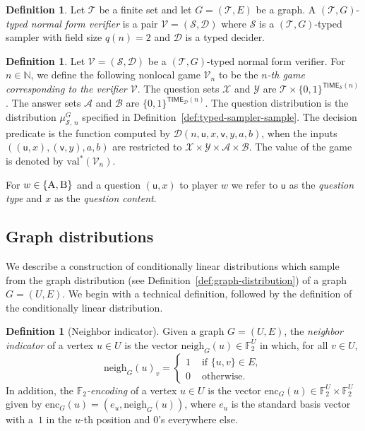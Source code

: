 \documentclass[11pt]{article}
\theoremstyle{definition}
\newtheorem{definition}[theorem]{Definition}
\newcommand{\N}{\ensuremath{\mathbb{N}}}
\newcommand{\F}{\ensuremath{\mathbb{F}}}
\newcommand{\val}{\ensuremath{\mathrm{val}}}
\newcommand{\sampler}{\mathcal{S}}
\newcommand{\decider}{\mathcal{D}}
\newcommand{\verifier}{\mathcal{V}}
\newcommand{\type}{\mathcal{T}}
\newcommand{\labelstyle}[1]{\ensuremath{\textsc{#1}}\xspace}
\newcommand{\tvarstyle}[1]{\mathsf{#1}}
\newcommand{\lvar}{\ensuremath{\tvarstyle{u}}}
\newcommand{\rvar}{\ensuremath{\tvarstyle{v}}}
\newcommand{\alice}{\labelstyle{A}}
\newcommand{\bob}{\labelstyle{B}}
\renewcommand{\cal}[1]{\mathcal{#1}}
\newcommand{\TIME}{\mathsf{TIME}}
\begin{document}
\begin{definition}
  \label{def:typed-normal-ver}
  Let $\type$ be a finite set and let $G = (\type, E)$ be a graph.
  A $(\type, G)$-\emph{typed normal form verifier} is a pair $\verifier =
  (\sampler, \decider)$ where $\sampler$ is a $(\type,G)$-typed sampler with field
  size $q(n) = 2$ and $\decider$ is a typed decider.
\end{definition}

\begin{definition}
  \label{def:typed-normal-game}
  Let $\verifier = (\sampler, \decider)$ be a $(\type, G)$-typed normal form
  verifier.
  For $n \in \N$, we define the following nonlocal game $\verifier_{n}$ to be
  the \emph{$n$-th game corresponding to the verifier $\verifier$}.
  The question sets $\cal{X}$ and $\cal{Y}$ are $\type \times
  \{0,1\}^{\TIME_\sampler(n)}$.
  The answer sets $\cal{A}$ and $\cal{B}$ are $\{0,1\}^{\TIME_\decider(n)}$.
  The question distribution is the distribution $\mu^G_{\sampler,\, n}$
  specified in Definition~\ref{def:typed-sampler-sample}.
  The decision predicate is the function computed by
  $\decider(n,\lvar,x,\rvar,y,a,b)$, when the inputs $((\lvar, x), (\rvar, y), a, b)$ are
  restricted to $\cal{X}\times \cal{Y}\times\cal{A}\times\cal{B}$.
  The value of the game is denoted by $\val^*(\verifier_{n})$.  
\end{definition}

For $w\in\{\alice,\bob\}$ and a question $(\lvar, x)$ to player $w$ we refer to
$\lvar$ as the \emph{question type} and $x$ as the \emph{question content}.

\subsection{Graph distributions}
\label{sec:graph-dist}

We describe a construction of conditionally linear distributions which sample
from the graph distribution (see Definition~\ref{def:graph-distribution}) of a
graph $G = (U, E)$.
We begin with a technical definition, followed by the definition of the
conditionally linear distribution.

\begin{definition}[Neighbor indicator]\label{def:type-neighbor}
  Given a graph $G = (U, E)$, the \emph{neighbor indicator} of a vertex $u \in
  U$ is the vector $\mathrm{neigh}_G(u) \in \F_2^U$ in which, for all $v \in U$,
  \begin{equation*}
    \mathrm{neigh}_G(u)_v =
    \begin{cases}
      1 & \text{ if } \{u, v\} \in E,\\
      0 & \text{ otherwise}.
    \end{cases}
  \end{equation*}
  In addition, the \emph{$\F_2$-encoding} of a vertex $u \in U$ is the vector
  $\mathrm{enc}_G(u) \in \F_2^U \times \F_2^U$ given by $\mathrm{enc}_G(u) =
  (e_u, \mathrm{neigh}_G(u))$, where $e_u$ is the standard basis vector with
  a~$1$ in the $u$-th position and $0$'s everywhere else.
\end{definition}
\end{document}
